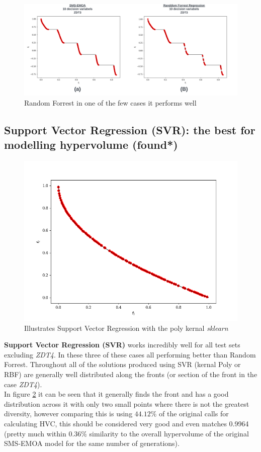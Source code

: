 \documentclass[sigconf,review,nonacm]{acmart}
\begin{document}
\begin{figure}[H]
    \centering
    \includegraphics[width=0.85\linewidth]{Images/SMS_vs_RF.png}
    \caption{Random Forrest in one of the few cases it performs well}
    \label{fig:rf}
\end{figure}

\subsection{Support Vector Regression (SVR): the best for modelling hypervolume (found*)}

\begin{figure}[h]
    \centering
    \includegraphics[width=0.7\linewidth]{Images/zvr-polykernal_1.png}
    \caption{Illustrates Support Vector Regression with the poly kernal \textit{sklearn}}
    \label{fig:svr-poly}
\end{figure}

\textbf{Support Vector Regression (SVR)} works incredibly well for all test sets excluding \textit{ZDT4}. In these three of these cases all performing better than Random Forrest. Throughout all of the solutions produced using SVR (kernal Poly or RBF) are generally well distributed along the fronts (or section of the front in the case \textit{ZDT4}). \\

\noindent In figure \ref{fig:svr-poly} it can be seen that it generally finds the front and has a good distribution across it with only two small points where there is not the greatest diversity, however comparing this is using $44.12\%$ of the original calls for calculating HVC, this should be considered very good and even matches 0.9964 (pretty much within 0.36\% similarity to the overall hypervolume of the original SMS-EMOA model for the same number of generations). \\
\end{document}
